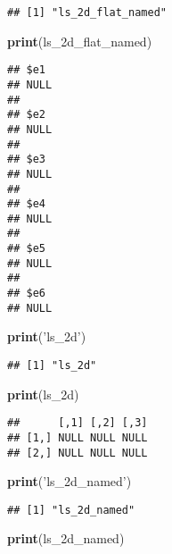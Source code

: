 \documentclass[
]{book}
\newenvironment{Shaded}{\begin{snugshade}}{\end{snugshade}}
\newcommand{\KeywordTok}[1]{\textcolor[rgb]{0.13,0.29,0.53}{\textbf{#1}}}
\newcommand{\NormalTok}[1]{#1}
\newcommand{\StringTok}[1]{\textcolor[rgb]{0.31,0.60,0.02}{#1}}
\begin{document}
\begin{verbatim}
## [1] "ls_2d_flat_named"
\end{verbatim}

\begin{Shaded}
\begin{Highlighting}[]
\KeywordTok{print}\NormalTok{(ls_2d_flat_named)}
\end{Highlighting}
\end{Shaded}

\begin{verbatim}
## $e1
## NULL
## 
## $e2
## NULL
## 
## $e3
## NULL
## 
## $e4
## NULL
## 
## $e5
## NULL
## 
## $e6
## NULL
\end{verbatim}

\begin{Shaded}
\begin{Highlighting}[]
\KeywordTok{print}\NormalTok{(}\StringTok{'ls_2d'}\NormalTok{)}
\end{Highlighting}
\end{Shaded}

\begin{verbatim}
## [1] "ls_2d"
\end{verbatim}

\begin{Shaded}
\begin{Highlighting}[]
\KeywordTok{print}\NormalTok{(ls_2d)}
\end{Highlighting}
\end{Shaded}

\begin{verbatim}
##      [,1] [,2] [,3]
## [1,] NULL NULL NULL
## [2,] NULL NULL NULL
\end{verbatim}

\begin{Shaded}
\begin{Highlighting}[]
\KeywordTok{print}\NormalTok{(}\StringTok{'ls_2d_named'}\NormalTok{)}
\end{Highlighting}
\end{Shaded}

\begin{verbatim}
## [1] "ls_2d_named"
\end{verbatim}

\begin{Shaded}
\begin{Highlighting}[]
\KeywordTok{print}\NormalTok{(ls_2d_named)}
\end{Highlighting}
\end{Shaded}
\end{document}
